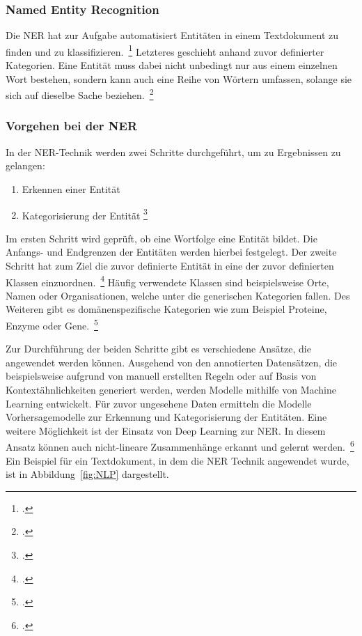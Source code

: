 \subsubsection{Named Entity Recognition}
Die \acl{NER} hat zur Aufgabe automatisiert Entitäten in einem Textdokument zu finden und zu klassifizieren.~\footcite[\vglf][]{kulkarni2022} Letzteres geschieht anhand zuvor definierter Kategorien.
Eine Entität muss dabei nicht unbedingt nur aus einem einzelnen Wort bestehen, sondern kann auch eine Reihe von Wörtern umfassen, solange sie sich auf dieselbe Sache beziehen.~\footcite[\vglf][]{strobl2022}

\subsubsection{Vorgehen bei der NER}
In der \ac{NER}-Technik werden zwei Schritte durchgeführt, um zu Ergebnissen zu gelangen:

\begin{enumerate}
    \item Erkennen einer Entität
    \item Kategorisierung der Entität \footcite[\vglf][ \& 230]{zong2021}
\end{enumerate}


Im ersten Schritt wird geprüft, ob eine Wortfolge eine Entität bildet. Die Anfangs- und Endgrenzen der Entitäten werden hierbei festgelegt. Der zweite Schritt hat zum Ziel die zuvor definierte Entität in eine der zuvor definierten Klassen einzuordnen.~\footcite[\vglf][]{bast2016}
Häufig verwendete Klassen sind beispielsweise Orte, Namen oder Organisationen, welche unter die generischen Kategorien fallen. Des Weiteren gibt es domänenspezifische Kategorien wie zum Beispiel Proteine, Enzyme oder Gene.~\footcite[\vglf][]{li.2018}


Zur Durchführung der beiden Schritte gibt es verschiedene Ansätze, die angewendet werden können. Ausgehend von den annotierten Datensätzen, die beispielsweise aufgrund von manuell erstellten Regeln oder auf Basis von Kontextähnlichkeiten generiert werden, werden Modelle mithilfe von Machine Learning entwickelt.
Für zuvor ungesehene Daten ermitteln die Modelle Vorhersagemodelle zur Erkennung und Kategorisierung der Entitäten. Eine weitere Möglichkeit ist der Einsatz von Deep Learning zur \ac{NER}. In diesem Ansatz können auch nicht-lineare Zusammenhänge erkannt und gelernt werden.~\footcite[\vglf][]{li.2018}
\\
Ein Beispiel für ein Textdokument, in dem die \ac{NER} Technik angewendet wurde, ist in Abbildung~\ref{fig:NLP} dargestellt.\\


